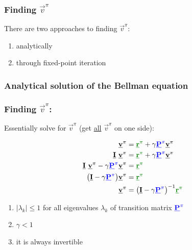 \begin{frame}\frametitle{Finding $\vec v^\pi$}

There are two approaches to finding $\vec v^\pi$:

\begin{enumerate}
\item[\ref{sec:findvanalytical} -] analytically
\item[\ref{sec:findviter} -] through fixed-point iteration
\end{enumerate}

\end{frame}

\subsubsection{Analytical solution of the Bellman equation}\label{sec:findvanalytical}

\begin{frame}\frametitle{Finding $\vec v^\pi$:~\subsubsecname}

Essentially solve for $\vec v^\pi$ (get \underline{all} $\vec v^\pi$ on one side):

\svspace{-5mm}

	\begin{align}
		\vec v^\pi &= {\color{reward}\vec r^\pi} 
		+ \gamma {\color{trans}\vec P^\pi} \vec v^\pi \\
		\vec I~\vec v^\pi 
        &= {\color{reward}\vec r^\pi}
		+ \gamma {\color{trans}\vec P^\pi} \vec v^\pi
	\\
		\vec I~\vec v^\pi - \gamma {\color{trans}\vec P^\pi} \vec v^\pi
		&= {\color{reward}\vec r^\pi}
	\\
		\big(\vec I - \gamma {\color{trans}\vec P^\pi}\big) \vec v^\pi
		&= {\color{reward}\vec r^\pi}
	\\
	\vec v^\pi &= \big(\vec I 
			- \gamma {\color{trans}\vec P^\pi}\big)^{-1}
		 {\color{reward}\vec r^\pi}
	\end{align}
	
		
\begin{enumerate}
\item $|\lambda_k| \leq 1$ for all eigenvalues 
				$\lambda_k$ of transition matrix ${\color{trans}\vec P^\pi}$
\item $\gamma < 1$
\item[$\Rightarrow$] it is always invertible
\end{enumerate}

\end{frame}

